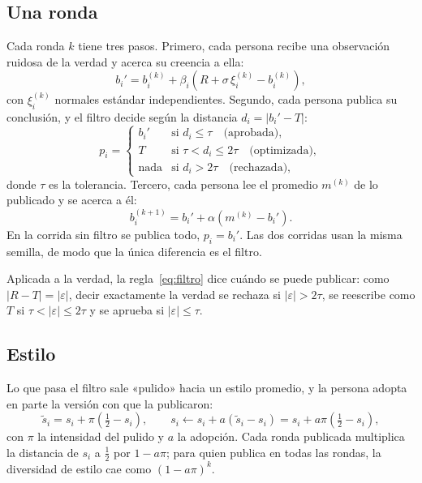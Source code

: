 \documentclass[11pt,a4paper]{article}
\begin{document}
\subsection{Una ronda}

Cada ronda $k$ tiene tres pasos. Primero, cada persona recibe una observación ruidosa de la verdad y acerca su creencia a ella:
\begin{equation}\label{eq:evidencia}
b_i' = b_i^{(k)} + \beta_i \left( R + \sigma\,\xi_i^{(k)} - b_i^{(k)} \right),
\end{equation}
con $\xi_i^{(k)}$ normales estándar independientes. Segundo, cada persona publica su conclusión, y el filtro decide según la distancia $d_i = |b_i' - T|$:
\begin{equation}\label{eq:filtro}
p_i =
\begin{cases}
b_i' & \text{si } d_i \le \tau \quad \text{(aprobada)},\\
T & \text{si } \tau < d_i \le 2\tau \quad \text{(optimizada)},\\
\text{nada} & \text{si } d_i > 2\tau \quad \text{(rechazada)},
\end{cases}
\end{equation}
donde $\tau$ es la tolerancia. Tercero, cada persona lee el promedio $m^{(k)}$ de lo publicado y se acerca a él:
\begin{equation}\label{eq:lectura}
b_i^{(k+1)} = b_i' + \alpha \left( m^{(k)} - b_i' \right).
\end{equation}
En la corrida sin filtro se publica todo, $p_i = b_i'$. Las dos corridas usan la misma semilla, de modo que la única diferencia es el filtro.

Aplicada a la verdad, la regla~\eqref{eq:filtro} dice cuándo se puede publicar: como $|R - T| = |\varepsilon|$, decir exactamente la verdad se rechaza si $|\varepsilon| > 2\tau$, se reescribe como $T$ si $\tau < |\varepsilon| \le 2\tau$ y se aprueba si $|\varepsilon| \le \tau$.

\subsection{Estilo}

Lo que pasa el filtro sale «pulido» hacia un estilo promedio, y la persona adopta en parte la versión con que la publicaron:
\begin{equation}\label{eq:estilo}
\tilde s_i = s_i + \pi \left( \tfrac12 - s_i \right), \qquad s_i \leftarrow s_i + a \left( \tilde s_i - s_i \right) = s_i + a\pi \left( \tfrac12 - s_i \right),
\end{equation}
con $\pi$ la intensidad del pulido y $a$ la adopción. Cada ronda publicada multiplica la distancia de $s_i$ a $\tfrac12$ por $1 - a\pi$; para quien publica en todas las rondas, la diversidad de estilo cae como $(1 - a\pi)^k$.
\end{document}
